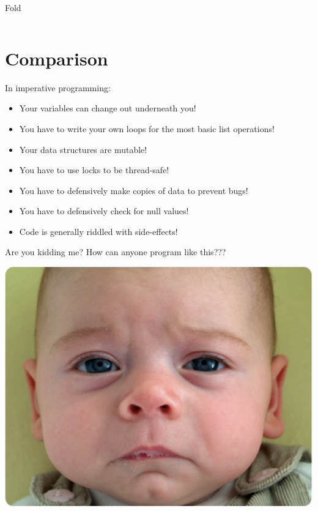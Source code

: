 \documentclass{beamer}
\begin{document}
\begin{frame}{Fold}

  \inputminted[fontsize=\small,firstline=57,lastline=71]{haskell}{code/haskell/accounts.hs}

\end{frame}

\section{Comparison}

\begin{frame}

  In imperative programming:

  \begin{itemize}[<+->]
  \item Your variables can change out underneath you!
  \item You have to write your own loops for the most basic list operations!
  \item Your data structures are mutable!
  \item You have to use locks to be thread-safe!
  \item You have to defensively make copies of data to prevent bugs!
  \item You have to defensively check for null values!
  \item Code is generally riddled with side-effects!
  \end{itemize}
\end{frame}

\begin{frame}{Are you kidding me?}
  How can anyone program like this???
  \begin{center}
    \includegraphics[scale=0.3]{img/sadbaby.png}
  \end{center}
\end{frame}
\end{document}
